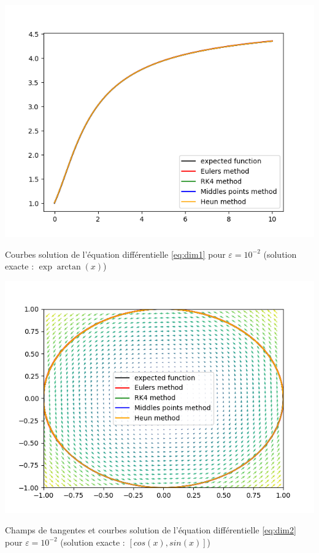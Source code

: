 \begin{minipage}[c]{.46\linewidth}
    \centering
    \includegraphics[scale=0.5]{images/dim1.png}
    \captionsetup{type=figure}\caption{Courbes solution de l'équation différentielle \ref{eq:dim1} pour $\varepsilon = 10^{-2}$ (solution exacte : $\exp\arctan(x)$)}
    \label{fig:dim1}
\end{minipage}
\hfill%
\begin{minipage}[c]{.46\linewidth}
    \centering
    \includegraphics[scale=0.5]{images/dim2.png}
    \captionsetup{type=figure}\caption{Champs de tangentes et courbes solution de l'équation différentielle \ref{eq:dim2} pour $\varepsilon = 10^{-2}$
    (solution exacte : $[cos(x), sin(x)]$)}
    \label{fig:dim2}
\end{minipage}
\vspace{4.00mm}


